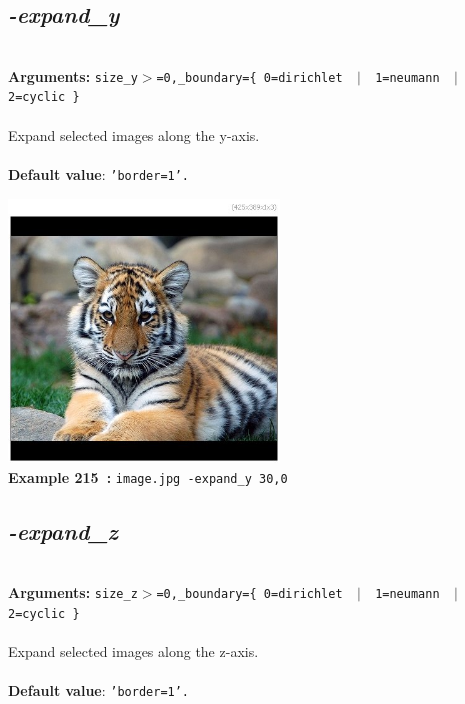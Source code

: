 \documentclass[a4paper,11pt,twoside]{book}
\begin{document}
\subsection{\emph{-expand\_y} }\vspace*{-0.5em}
~\\\textbf{Arguments: } 
{\small \texttt{size\_y$>$=0,\_boundary=\{ 0=dirichlet ~$|$~ 1=neumann ~$|$~ 2=cyclic \}}}\\~\\
Expand selected images along the y-axis.
~\\~\\\textbf{Default value}: {\small \texttt{'border=1'.}}
\begin{center}\includegraphics[keepaspectratio=true,height=7cm,width=\textwidth]{img/gmic_def215.jpg}\\
{\footnotesize \textbf{Example 215~:} \texttt{image.jpg -expand\_y 30,0}}
\end{center}

\subsection{\emph{-expand\_z} }\vspace*{-0.5em}
~\\\textbf{Arguments: } 
{\small \texttt{size\_z$>$=0,\_boundary=\{ 0=dirichlet ~$|$~ 1=neumann ~$|$~ 2=cyclic \}}}\\~\\
Expand selected images along the z-axis.
~\\~\\\textbf{Default value}: {\small \texttt{'border=1'.}}
\end{document}
